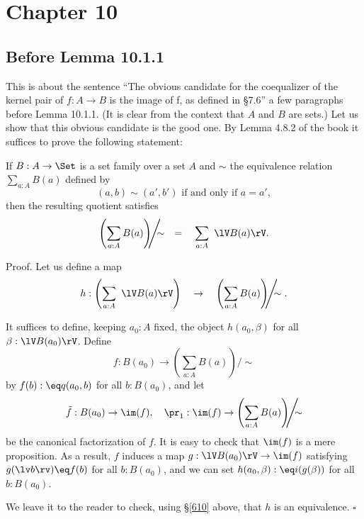 \documentclass[12pt]{article}
\begin{document}

\section{Chapter 10}

\subsection{Before Lemma 10.1.1}

This is about the sentence ``The obvious candidate for the coequalizer of the kernel pair of $f:A\to B$ is the image of f, as defined in \S7.6'' a few paragraphs before Lemma 10.1.1. (It is clear from the context that $A$ and $B$ are sets.) Let us show that this obvious candidate is the good one. By Lemma 4.8.2 of the book it suffices to prove the following statement:

If $B:A\to\Set$ is a set family over a set $A$ and $\sim$ the equivalence relation $\sum_{a:A}B(a)$ defined by 
$$
(a,b)\sim(a',b')\text{ if and only if }a=a',
$$ 
then the resulting quotient satisfies
$$
\left(\sum_{a:A}B(a)\right)\!\!\!\Bigg/\!\!\!\!\sim\quad=\quad\sum_{a:A}\ \lV B(a)\rV.
$$

Proof. Let us define a map 
$$
h:\left(\sum_{a:A}\ \lV B(a)\rV\right)\quad\to\quad\left(\sum_{a:A}B(a)\right)\!\!\!\Bigg/\!\!\!\!\sim.
$$ 

It suffices to define, keeping $a_0:A$ fixed, the object $h(a_0,\beta)$ for all $\beta:\lV B(a_0)\rV$. Define 
$$
f:B(a_0)\to\left(\sum_{a:A}B(a)\right)\!\!\!\Bigg/\!\!\!\!\sim
$$ 
by $f(b):\eq q(a_0,b)$ for all $b:B(a_0)$, and let 
$$
\tilde f:B(a_0)\to\im(f),\quad\pr_1:\im(f)\to\left(\sum_{a:A}B(a)\right)\!\!\!\Bigg/\!\!\!\!\sim
$$ 
be the canonical factorization of $f$. It is easy to check that $\im(f)$ is a mere proposition. As a result, $f$ induces a map $g:\lV B(a_0)\rV\to\im(f)$ satisfying $g(\lv b\rv)\eq f(b)$ for all $b:B(a_0)$, and we can set $h(a_0,\beta):\eq i(g(\beta))$ for all $b:B(a_0)$.

We leave it to the reader to check, using \S\ref{610} above, that $h$ is an equivalence. $\square$
\end{document}
